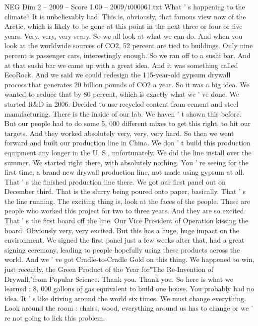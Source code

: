 \begin{textsample}{NEG Dim 2 – 2009 – Score 1.00 – 2009/t000061.txt}  \label{ex:f2_neg_005}
What ' s happening to the climate?
It is unbelievably bad.
This is, obviously, that famous view now of the Arctic, which is likely to be gone at this point in the next three or four or five years.
Very, very, very scary.
So we all look at what we can do.
And when you look at the worldwide sources of CO2, 52 percent are tied to buildings.
Only nine percent is passenger cars, interestingly enough.
So we ran off to a sushi bar.
And at that sushi bar we came up with a great idea.
And it was something called EcoRock.
And we said we could redesign the 115-year-old gypsum drywall process that generates 20 billion pounds of CO2 a year.
So it was a big idea.
We wanted to reduce that by 80 percent, which is exactly what we ' ve done.
We started R\&D in 2006.
Decided to use recycled content from cement and steel manufacturing.
There is the inside of our lab.
We haven ' t shown this before.
But our people had to do some 5, 000 different mixes to get this right, to hit our targets.
And they worked absolutely very, very, very hard.
So then we went forward and built our production line in China.
We don ' t build this production equipment any longer in the U.
S., unfortunately.
We did the line install over the summer.
We started right there, with absolutely nothing.
You ' re seeing for the first time, a brand new drywall production line, not made using gypsum at all.
That ' s the finished production line there.
We got our first panel out on December third.
That is the slurry being poured onto paper, basically.
That ' s the line running.
The exciting thing is, look at the faces of the people.
These are people who worked this project for two to three years.
And they are so excited.
That ' s the first board off the line.
Our Vice President of Operation kissing the board.
Obviously very, very excited.
But this has a huge, huge impact on the environment.
We signed the first panel just a few weeks after that, had a great signing ceremony, leading to people hopefully using these products across the world.
And we ' ve got Cradle-to-Cradle Gold on this thing.
We happened to win, just recently, the Green Product of the Year for"The Re-Invention of Drywall,"from Popular Science.
Thank you.
Thank you.
So here is what we learned : 8, 000 gallons of gas equivalent to build one house.
You probably had no idea.
It ' s like driving around the world six times.
We must change everything.
Look around the room : chairs, wood, everything around us has to change or we ' re not going to lick this problem.

\end{textsample}

